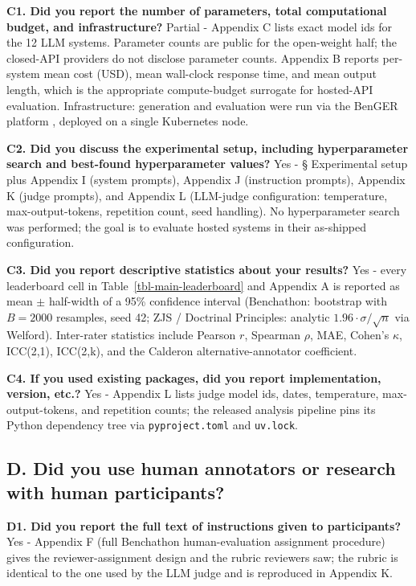 \documentclass[11pt]{article}
\begin{document}
\textbf{C1. Did you report the number of parameters, total computational
budget, and infrastructure?} Partial - Appendix C lists exact model ids
for the 12 LLM systems. Parameter counts are public for the open-weight
half; the closed-API providers do not disclose parameter counts.
Appendix B reports per-system mean cost (USD), mean wall-clock response
time, and mean output length, which is the appropriate compute-budget
surrogate for hosted-API evaluation. Infrastructure: generation and
evaluation were run via the BenGER platform \citep{nagl2026benger},
deployed on a single Kubernetes node.

\textbf{C2. Did you discuss the experimental setup, including
hyperparameter search and best-found hyperparameter values?} Yes - §
Experimental setup plus Appendix I (system prompts), Appendix J
(instruction prompts), Appendix K (judge prompts), and Appendix L
(LLM-judge configuration: temperature, max-output-tokens, repetition
count, seed handling). No hyperparameter search was performed; the goal
is to evaluate hosted systems in their as-shipped configuration.

\textbf{C3. Did you report descriptive statistics about your results?}
Yes - every leaderboard cell in Table~\ref{tbl-main-leaderboard} and
Appendix A is reported as mean \(\pm\) half-width of a 95\% confidence
interval (Benchathon: bootstrap with \(B=2000\) resamples, seed 42; ZJS
/ Doctrinal Principles: analytic \(1.96 \cdot \sigma/\sqrt{n}\) via
Welford). Inter-rater statistics include Pearson \(r\), Spearman
\(\rho\), MAE, Cohen's \(\kappa\), ICC(2,1), ICC(2,k), and the Calderon
alternative-annotator coefficient.

\textbf{C4. If you used existing packages, did you report
implementation, version, etc.?} Yes - Appendix L lists judge model ids,
dates, temperature, max-output-tokens, and repetition counts; the
released analysis pipeline pins its Python dependency tree via
\texttt{pyproject.toml} and \texttt{uv.lock}.

\subsection{D. Did you use human annotators or research with human
participants?}\label{d.-did-you-use-human-annotators-or-research-with-human-participants}

\textbf{D1. Did you report the full text of instructions given to
participants?} Yes - Appendix F (full Benchathon human-evaluation
assignment procedure) gives the reviewer-assignment design and the
rubric reviewers saw; the rubric is identical to the one used by the LLM
judge and is reproduced in Appendix K.
\end{document}
